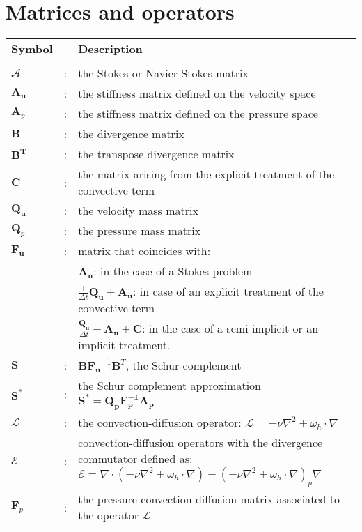 \section*{Matrices and operators}
\vspace{-6mm}
\begin{longtable}{lcp{}l}
  \textbf{Symbol} & & \textbf{Description} \\
   & & & \\
 $\mathcal{A}$ & : & the Stokes or Navier-Stokes matrix\\
 $\mathbf{A_u}$ & : & the stiffness matrix defined on the velocity space \\
 $\mathbf{A}_p$ & : & the stiffness matrix defined on the pressure space \\
 $\mathbf{B}$ & : & the divergence matrix \\
 $\mathbf{B^T}$ & : & the transpose divergence matrix\\
 $\mathbf{C}$ &:&the matrix arising from the explicit treatment of the convective term\\
 $\mathbf{Q_u}$ & : & the velocity mass matrix\\
 $\mathbf{Q}_p$ & : & the pressure mass matrix\\
 $\mathbf{F_u}$ & : & matrix that coincides with: & \\
 &&$\displaystyle  \mathbf{A_u}$: in the case of a Stokes problem&\\
 &&$\displaystyle  \frac{1}{\Delta t} \mathbf{Q_u} + \mathbf{A_u}$: in case of an explicit treatment of the convective term &\\
 &&$\displaystyle  \frac{\mathbf{Q_u}}{\Delta t} + \mathbf{A_u} + \mathbf{C}$: in the case of a semi-implicit or an implicit treatment. &\\
 $\mathbf{S}$ &: & $\mathbf{B} \mathbf{F_u}^{-1}\mathbf{B}^T$, the Schur complement \\
 $\mathbf{S^*}$ & : & the Schur complement approximation $\mathbf{S^*} = \mathbf{Q_pF_p^{-1}A_p}$\\
$\mathcal{L}$ &:& the convection-diffusion operator: $\mathcal{L}= -\nu \nabla^2 + \omega_h \cdot \nabla $ & \\
$\mathcal{E}$ & : & convection-diffusion operators with the divergence commutator defined as:  $\mathcal{E} = \nabla \cdot (-\nu\nabla^2 + \omega_h \cdot \nabla) - (-\nu\nabla^2 + \omega_h \cdot \nabla)_p \nabla$ & \\
$\mathbf{F}_p$ & : & the pressure convection diffusion matrix associated to the operator $\mathcal{L}$ &\\
\end{longtable}

